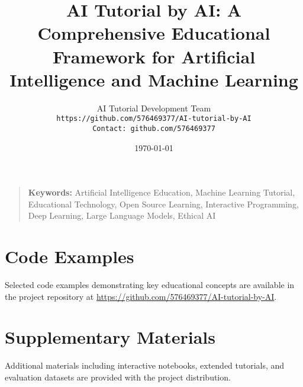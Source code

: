 \documentclass[11pt,twocolumn]{article}
\title{AI Tutorial by AI: A Comprehensive Educational Framework for Artificial Intelligence and Machine Learning}
\author{
    AI Tutorial Development Team\\
    \texttt{https://github.com/576469377/AI-tutorial-by-AI}\\
    \texttt{Contact: github.com/576469377}
}
\date{\today}
\begin{document}
\maketitle



\begin{quote}
\textbf{Keywords:} Artificial Intelligence Education, Machine Learning Tutorial, Educational Technology, Open Source Learning, Interactive Programming, Deep Learning, Large Language Models, Ethical AI
\end{quote}











\appendix
\section{Code Examples}
\label{appendix:code}

Selected code examples demonstrating key educational concepts are available in the project repository at \url{https://github.com/576469377/AI-tutorial-by-AI}.

\section{Supplementary Materials}
\label{appendix:materials}

Additional materials including interactive notebooks, extended tutorials, and evaluation datasets are provided with the project distribution.
\end{document}
